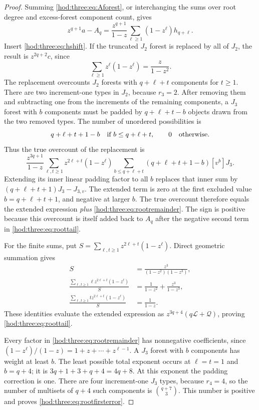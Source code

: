 \documentclass[11pt,letterpaper]{article}
\theoremstyle{definition}\newtheorem{definition}[theorem]{Definition}
\theoremstyle{remark}\newtheorem{remark}[theorem]{Remark}
\newcommand{\Lcal}{\mathcal L}
\newcommand{\Qcal}{\mathcal Q}
\begin{document}
\begin{proof}
Summing \eqref{hod:three:eq:Aforest}, or interchanging the sums over root degree and excess-forest component count, gives
\begin{equation}\label{hod:three:eq:taildiff}
z^{q+1}a-A_q=\frac{z^{q+1}}{1-z}\sum_{\ell\ge1}(1-z^\ell)h_{q+\ell}.
\end{equation}
Insert \eqref{hod:three:eq:hshift}. If the truncated $J_2$ forest is replaced by all of $J_2$, the result is $z^{2q+2}c$, since
\[
\sum_{\ell\ge1}z^\ell(1-z^\ell)=\frac{z}{1-z^2}.
\]
The replacement overcounts $J_2$ forests with $q+\ell+t$ components for $t\ge1$. There are two increment-one types in $J_2$, because $r_3=2$. After removing them and subtracting one from the increments of the remaining components, a $J_3$ forest with $b$ components must be padded by $q+\ell+t-b$ objects drawn from the two removed types. The number of unordered possibilities is
\begin{equation}\label{hod:three:eq:padding}
q+\ell+t+1-b\quad\hbox{if } b\le q+\ell+t,\qquad 0\quad\hbox{otherwise}.
\end{equation}
Thus the true overcount of the replacement is
\[
\frac{z^{3q+1}}{1-z}\sum_{\ell,t\ge1}z^{2\ell+t}(1-z^\ell)
\sum_{b\le q+\ell+t}(q+\ell+t+1-b)[v^b]J_3.
\]
Extending its inner linear padding factor to all $b$ replaces that inner sum by
$(q+\ell+t+1)J_3-J_{3,v}$. The extended term is zero at the first excluded value $b=q+\ell+t+1$, and negative at larger $b$. The true overcount therefore equals the extended expression \emph{plus} \eqref{hod:three:eq:rootremainder}. The sign is positive because this overcount is itself added back to $A_q$ after the negative second term in \eqref{hod:three:eq:roottail}.

For the finite sums, put $S=\sum_{\ell,t\ge1}z^{2\ell+t}(1-z^\ell)$. Direct geometric summation gives
\begin{align*}
S&=\frac{z^3}{(1-z^2)(1-z^3)},\\
\frac{\sum_{\ell,t\ge1}\ell z^{2\ell+t}(1-z^\ell)}S
&=\frac1{1-z^2}+\frac{z^3}{1-z^3},\\
\frac{\sum_{\ell,t\ge1}t z^{2\ell+t}(1-z^\ell)}S
&=\frac1{1-z}.
\end{align*}
These identities evaluate the extended expression as $z^{3q+4}(q\Lcal+\Qcal)$, proving \eqref{hod:three:eq:roottail}.

Every factor in \eqref{hod:three:eq:rootremainder} has nonnegative coefficients, since $(1-z^\ell)/(1-z)=1+z+\cdots+z^{\ell-1}$. A $J_3$ forest with $b$ components has weight at least $b$. The least possible total exponent occurs at $\ell=t=1$ and $b=q+4$; it is $3q+1+3+q+4=4q+8$. At this exponent the padding correction is one. There are four increment-one $J_3$ types, because $r_4=4$, so the number of multisets of $q+4$ such components is $\binom{q+7}{3}$. This number is positive and proves \eqref{hod:three:eq:rootfirsterror}.
\end{proof}
\end{document}
